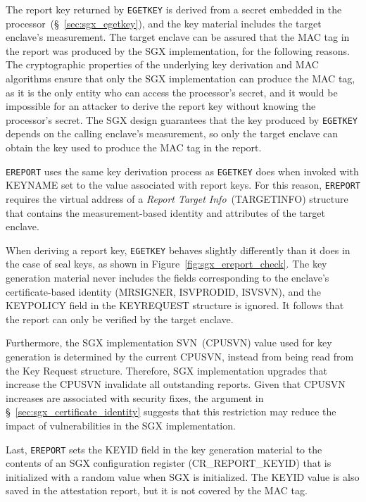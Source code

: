 The report key returned by \texttt{EGETKEY} is derived from a secret embedded
in the processor~(\S~\ref{sec:sgx_egetkey}), and the key material includes the
target enclave's measurement. The target enclave can be assured that the MAC
tag in the report was produced by the SGX implementation, for the following
reasons. The cryptographic properties of the underlying key derivation and
MAC algorithms ensure that only the SGX implementation can produce the MAC tag,
as it is the only entity who can access the processor's secret, and it would be
impossible for an attacker to derive the report key without knowing the
processor's secret. The SGX design guarantees that the key produced by
\texttt{EGETKEY} depends on the calling enclave's measurement, so only the
target enclave can obtain the key used to produce the MAC tag in the report.

\texttt{EREPORT} uses the same key derivation process as \texttt{EGETKEY}
does when invoked with KEYNAME set to the value associated with report keys.
For this reason, \texttt{EREPORT} requires the virtual address of a
\textit{Report Target Info}~(TARGETINFO) structure that contains the
measurement-based identity and attributes of the target enclave.


When deriving a report key, \texttt{EGETKEY} behaves slightly differently than
it does in the case of seal keys, as shown in
Figure~\ref{fig:sgx_ereport_check}. The key generation material never includes
the fields corresponding to the enclave's certificate-based identity (MRSIGNER,
ISVPRODID, ISVSVN), and the KEYPOLICY field in the KEYREQUEST structure is
ignored. It follows that the report can only be verified by the target enclave.

Furthermore, the SGX implementation SVN~(CPUSVN) value used for key generation
is determined by the current CPUSVN, instead from being read from the Key
Request structure. Therefore, SGX implementation upgrades that increase the
CPUSVN invalidate all outstanding reports. Given that CPUSVN increases are
associated with security fixes, the argument in
\S~\ref{sec:sgx_certificate_identity} suggests that this restriction may reduce
the impact of vulnerabilities in the SGX implementation.

Last, \texttt{EREPORT} sets the KEYID field in the key generation material to
the contents of an SGX configuration register (CR\_REPORT\_KEYID) that is
initialized with a random value when SGX is initialized. The KEYID value is
also saved in the attestation report, but it is not covered by the MAC tag.

